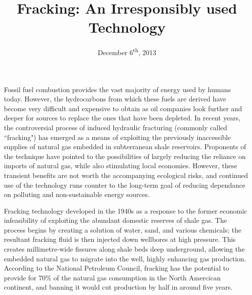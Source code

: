 \documentclass[12pt,letterpaper]{article}
\title{Fracking: An Irresponsibly used Technology}
\date{December 6\textsuperscript{th}, 2013}
\begin{document}
\makeheader

Fossil fuel combustion provides the vast majority of energy used by humans today. However, the hydrocarbons from which these fuels are derived have become very difficult and expensive to obtain as oil companies look further and deeper for sources to replace the ones that have been depleted. In recent years, the controversial process of induced hydraulic fracturing (commonly called ``fracking") has emerged as a means of exploiting the previously inaccessible supplies of natural gas embedded in subterranean shale reservoirs. Proponents of the technique have pointed to the possibilities of largely reducing the reliance on imports of natural gas, while also stimulating local economies. However, these transient benefits are not worth the accompanying ecological risks, and continued use of the technology runs counter to the long-term goal of reducing dependance on polluting and non-sustainable energy sources.

Fracking technology developed in the 1940s as a response to the former economic infeasibility of exploiting the abundant domestic reserves of shale gas.
The process begins by creating a solution of water, sand, and various chemicals; the resultant fracking fluid is then injected down wellbores at high pressure. This creates millimetre-wide fissures along shale beds deep underground, allowing the embedded natural gas to migrate into the well, highly enhancing gas production. According to the National Petroleum Council, fracking has the potential to provide for 70\%  \cite{npc}  of the natural gas consumption in the North Amercican continent, and banning it would cut production by half in around five years.
\end{document}
